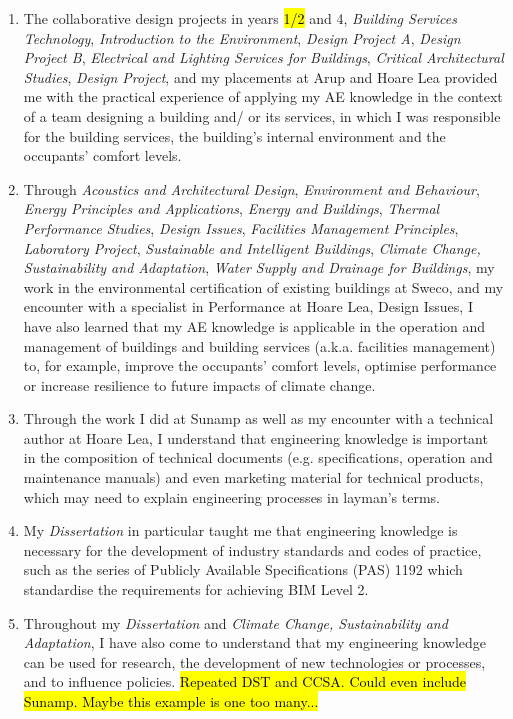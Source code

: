 \begin{enumerate}
	\item The collaborative design projects in years \hl{1/2} and 4,
	\textit{Building Services Technology},
	\textit{Introduction to the Environment},
	\textit{Design Project A},
	\textit{Design Project B},
	\textit{Electrical and Lighting Services for Buildings},
	\textit{Critical Architectural Studies},
	\textit{Design Project},  
	and my placements at Arup and Hoare Lea
	provided me with the practical experience of applying my AE knowledge in the context of a team designing a building and/ or its services, in which I was responsible for the building services, the building's internal environment and the occupants' comfort levels.
	
	\item Through
	\textit{Acoustics and Architectural Design},
	\textit{Environment and Behaviour},
	\textit{Energy Principles and Applications},
	\textit{Energy and Buildings},
	\textit{Thermal Performance Studies},
	\textit{Design Issues},
	\textit{Facilities Management Principles},
	\textit{Laboratory Project},
	\textit{Sustainable and Intelligent Buildings},
	\textit{Climate Change, Sustainability and Adaptation},
	\textit{Water Supply and Drainage for Buildings},
	my work in the environmental certification of existing buildings at Sweco,
	and
	my encounter with a specialist in Performance at Hoare Lea,
	Design Issues,
	I have also learned that my AE knowledge is applicable in the operation and management of buildings and building services (a.k.a. facilities management) to, for example, improve the occupants' comfort levels, optimise performance or increase resilience to future impacts of climate change.
	
	\item Through the work I did at Sunamp as well as my encounter with a technical author at Hoare Lea, I understand that engineering knowledge is important in the composition of technical documents (e.g. specifications, operation and maintenance manuals) and even marketing material for technical products, which may need to explain engineering processes in layman's terms.
	
	\item My \textit{Dissertation} in particular taught me that engineering knowledge is necessary for the development of industry standards and codes of practice, such as the series of Publicly Available Specifications (PAS) 1192 which standardise the requirements for achieving BIM Level 2.
	
	\item Throughout my \textit{Dissertation} and \textit{Climate Change, Sustainability and Adaptation}, I have also come to understand that my engineering knowledge can be used for research, the development of new technologies or processes, and to influence policies. \hl{Repeated DST and CCSA. Could even include Sunamp. Maybe this example is one too many...}
\end{enumerate}


